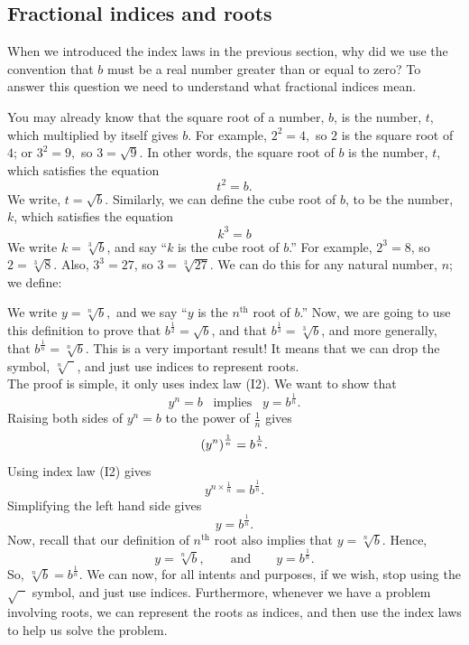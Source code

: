 \subsection{Fractional indices and roots} \label{fractional indices}
When we introduced the index laws in the previous section, why did we use the convention that $b$ must be a real number greater than or equal to zero? To answer this question we need to understand what fractional indices mean. \\ \label{inverse operation}

\noindent You may already know that the square root of a number, $b$, is the number, $t$, which multiplied by itself gives $b$. For example, $2^2 = 4,$ so $2$ is the square root of $4$; or $3^2 = 9,$ so $3 = \sqrt{9}$. In other words, the square root of $b$ is the number, $t$, which satisfies the equation
\[
t^2 = b.
\]
We write, $t = \sqrt{b}$. Similarly, we can define the cube root of $b$, to be the number, $k$, which satisfies the equation
\[
k^3 = b
\]
We write $k = \sqrt[3]{b}$, and say ``$k$ is the cube root of $b$.'' For example, $2^3 = 8$, so $2 = \sqrt[3]{8}$. Also, $3^3 = 27$, so $3 = \sqrt[3]{27}$. We can do this for any natural number, $n$; we define:

\bigskip
\hfil{}
\bigskip

\noindent We write $y = \sqrt[n]{b},$ and we say ``$y$ is the $n^{\text{th}}$ root of $b$.'' Now, we are going to use this definition to prove that $b^{\frac{1}{2}} = \sqrt{b}$, and that $b^\frac{1}{3} = \sqrt[3]{b}$, and more generally, that $b^\frac{1}{n} = \sqrt[n]{b}$. This is a very important result! It means that we can drop the symbol, $\sqrt[n]{\phantom{2}}$, and just use indices to represent roots. \\

\noindent The proof is simple, it only uses index law (I2). We want to show that
\[
y^n = b \;\;\; \text{implies} \;\;\; y = b^\frac{1}{n}.
\]
Raising both sides of $y^n = b$ to the power of $\frac{1}{n}$ gives
\[
\left(y^n\right)^\frac{1}{n} = b^\frac{1}{n}.
\]
Using index law (I2) gives
\[
y^{n\times\frac{1}{n}} = b^\frac{1}{n}.
\]
Simplifying the left hand side gives
\[
y = b^\frac{1}{n}.
\]
Now, recall that our definition of $n^{\text{th}}$ root also implies that $y = \sqrt[n]{b}$. Hence,
\[
y = \sqrt[n]{b}, \qquad \text{and} \qquad y = b^\frac{1}{n}.
\]
So, $\sqrt[n]{b} = b^\frac{1}{n}$. We can now, for all intents and purposes, if we wish, stop using the $\sqrt{\phantom{n}}$ symbol, and just use indices. Furthermore, whenever we have a problem involving roots, we can represent the roots as indices, and then use the index laws to help us solve the problem. \\

